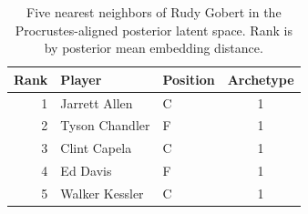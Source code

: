 \begin{table}[htbp]
  \centering\small
  \begin{tabular}{rllc}
    \toprule
    Rank & Player & Position & Archetype \\
    \midrule
    1 & Jarrett Allen & C & 1 \\
    2 & Tyson Chandler & F & 1 \\
    3 & Clint Capela & C & 1 \\
    4 & Ed Davis & F & 1 \\
    5 & Walker Kessler & C & 1 \\
    \bottomrule
  \end{tabular}
  \caption{Five nearest neighbors of Rudy Gobert in the Procrustes-aligned posterior latent space. Rank is by posterior mean embedding distance.}
  \label{tab:Rudy_Gobert_neighbors}
\end{table}

